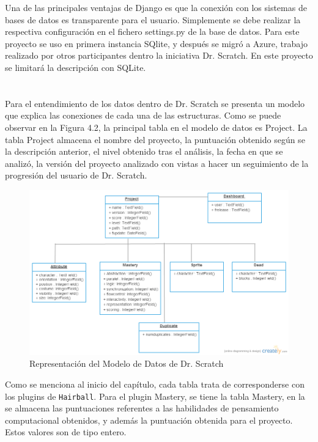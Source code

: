 \documentclass[a4paper, 12pt]{book}
\begin{document}
Una de las principales ventajas de Django es que la conexión con los sistemas de bases
de datos es transparente para el usuario. Simplemente se debe realizar la respectiva 
configuración en el fichero settings.py de la base de datos. Para este proyecto se uso
en primera instancia SQlite, y después se migró a Azure, trabajo realizado por otros 
participantes dentro la iniciativa Dr. Scratch. En este proyecto se limitará la 
descripción con SQLite. \\ \\ \\
 
Para el entendimiento de los datos dentro de Dr. Scratch se presenta un modelo que 
explica las conexiones de cada una de las estructuras. Como se puede observar en la 
Figura 4.2, la principal tabla en el modelo de datos es Project. La tabla Project 
almacena el nombre del proyecto, la puntuación obtenido según se la descripción 
anterior, el nivel obtenido tras el análisis, la fecha en que se analizó, la versión 
del proyecto analizado con vistas a hacer un seguimiento de la progresión del 
usuario de Dr. Scratch. \\

 \begin{figure}
    \centering
		\graphicspath{{img/}}
    \includegraphics[bb=0 0 800 600, width=12cm, keepaspectratio]{modelo.png}
    \caption{Representación del Modelo de Datos de Dr. Scratch}
    \label{figura:foro_hilos}
 \end{figure}



Como se menciona al inicio del capítulo, cada tabla trata de corresponderse con los
plugins de \texttt{Hairball}. Para el plugin Mastery, se tiene la tabla Mastery, en
la se almacena las puntuaciones referentes a las habilidades de pensamiento 
computacional obtenidos, y además la puntuación obtenida para el proyecto. Estos 
valores son de tipo entero.
\end{document}
